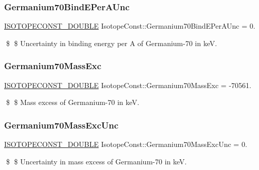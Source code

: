 \subsubsection{\texorpdfstring{Germanium70\+Bind\+E\+Per\+A\+Unc}{Germanium70BindEPerAUnc}}
{\footnotesize\ttfamily \mbox{\hyperlink{group___isotope_const-_macros_ga8f45a7272ce02c0b4c65c44636ed719a}{I\+S\+O\+T\+O\+P\+E\+C\+O\+N\+S\+T\+\_\+\+D\+O\+U\+B\+LE}} Isotope\+Const\+::\+Germanium70\+Bind\+E\+Per\+A\+Unc = 0.}

\$ \$ Uncertainty in binding energy per A of Germanium-\/70 in keV. \mbox{\label{group___isotope_const-_germanium-_ge70_ga6e51485e255e1c0ce5fcf74a179c3501}} 
\subsubsection{\texorpdfstring{Germanium70\+Mass\+Exc}{Germanium70MassExc}}
{\footnotesize\ttfamily \mbox{\hyperlink{group___isotope_const-_macros_ga8f45a7272ce02c0b4c65c44636ed719a}{I\+S\+O\+T\+O\+P\+E\+C\+O\+N\+S\+T\+\_\+\+D\+O\+U\+B\+LE}} Isotope\+Const\+::\+Germanium70\+Mass\+Exc = -\/70561.}

\$ \$ Mass excess of Germanium-\/70 in keV. \mbox{\label{group___isotope_const-_germanium-_ge70_ga455e1a8358b0447a6dc5c0014d0ddda2}} 
\subsubsection{\texorpdfstring{Germanium70\+Mass\+Exc\+Unc}{Germanium70MassExcUnc}}
{\footnotesize\ttfamily \mbox{\hyperlink{group___isotope_const-_macros_ga8f45a7272ce02c0b4c65c44636ed719a}{I\+S\+O\+T\+O\+P\+E\+C\+O\+N\+S\+T\+\_\+\+D\+O\+U\+B\+LE}} Isotope\+Const\+::\+Germanium70\+Mass\+Exc\+Unc = 0.}

\$ \$ Uncertainty in mass excess of Germanium-\/70 in keV. \mbox{\label{group___isotope_const-_germanium-_ge70_ga07b3ed85f0ea9681667f562c4d9b2f62}} 
